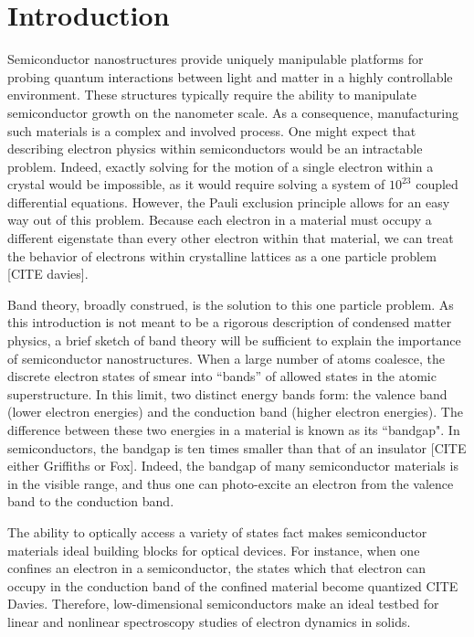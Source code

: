 \chapter{Introduction}


\indent Semiconductor nanostructures provide uniquely manipulable platforms for probing quantum interactions between light and matter in a highly controllable environment. These structures typically require the ability to manipulate semiconductor growth on the nanometer scale. As a consequence, manufacturing such materials is a complex and involved process. One might expect that describing electron physics within semiconductors would be an intractable problem. Indeed, exactly solving for the motion of a single electron within a crystal would be impossible, as it would require solving a system of $10^23$ coupled differential equations.  However, the Pauli exclusion principle allows for an easy way out of this problem. Because each electron in a material must occupy a different eigenstate than every other electron within that material, we can treat the behavior of electrons within crystalline lattices as a one particle problem [CITE davies]. 

\indent Band theory, broadly construed, is the solution to this one particle problem. As this introduction is not meant to be a rigorous description of condensed matter physics, a brief sketch of band theory will be sufficient to explain the importance of semiconductor nanostructures. When a large number of atoms coalesce, the discrete electron states of smear into ``bands'' of allowed states in the atomic superstructure. In this limit, two distinct energy bands form: the valence band (lower electron energies) and the conduction band (higher electron energies). The difference between these two energies in a material is known as its ``bandgap". In semiconductors, the bandgap is ten times smaller than that of an insulator [CITE either Griffiths or Fox]. Indeed, the bandgap of many semiconductor materials is in the visible range, and thus one can photo-excite an electron from the valence band to the conduction band.

\indent The ability to optically access a variety of states fact makes semiconductor materials ideal building blocks for optical devices. For instance, when one confines an electron in a semiconductor, the states which that electron can occupy in the conduction band of the confined material become quantized CITE Davies. Therefore, low-dimensional semiconductors make an ideal testbed for linear and nonlinear spectroscopy studies of electron dynamics in solids.

